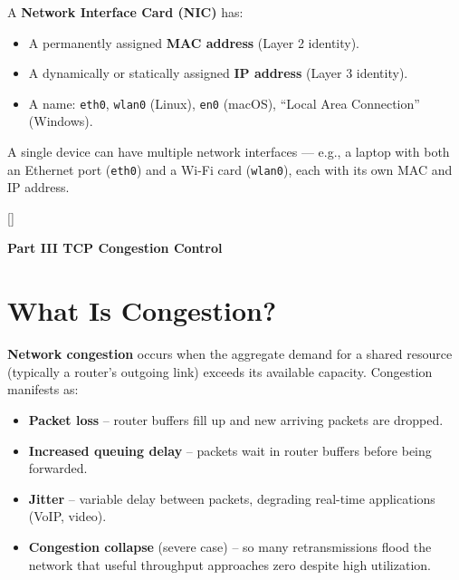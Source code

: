 \documentclass[11pt, letterpaper]{article}
\newcommand{\orangesections}{%
  \titleformat{\section}{\large\bfseries\color{sectionorange}}{}{0em}{}[\color{sectionorange}\titlerule]%
  \titleformat{\subsection}{\normalsize\bfseries\color{sectionorange!80!black}}{}{0em}{}%
}
\newcommand{\partbanner}[3]{%
  \begin{tcolorbox}[colback=#1, colframe=#2, boxrule=1.2pt, arc=4pt,
    left=8pt, right=8pt, top=6pt, bottom=6pt]
    \begin{center}{\LARGE\bfseries #3}\end{center}
  \end{tcolorbox}%
}
\begin{document}
A \textbf{Network Interface Card (NIC)} has:
\begin{itemize}[noitemsep]
  \item A permanently assigned \textbf{MAC address} (Layer 2 identity).
  \item A dynamically or statically assigned \textbf{IP address} (Layer 3 identity).
  \item A name: \texttt{eth0}, \texttt{wlan0} (Linux), \texttt{en0} (macOS), ``Local Area
        Connection'' (Windows).
\end{itemize}

A single device can have multiple network interfaces --- e.g., a laptop with both an Ethernet
port (\texttt{eth0}) and a Wi-Fi card (\texttt{wlan0}), each with its own MAC and IP address.


\newpage

\orangesections
{}
\partbanner{part4bg}{sectionorange}{Part III \quad TCP Congestion Control}

\vspace{8pt}

\section*{What Is Congestion?}

\textbf{Network congestion} occurs when the aggregate demand for a shared resource (typically a router's outgoing link) exceeds its available capacity. Congestion manifests as:

\begin{itemize}[noitemsep]
  \item \textbf{Packet loss} -- router buffers fill up and new arriving packets are dropped.
  \item \textbf{Increased queuing delay} -- packets wait in router buffers before being forwarded.
  \item \textbf{Jitter} -- variable delay between packets, degrading real-time applications (VoIP, video).
  \item \textbf{Congestion collapse} (severe case) -- so many retransmissions flood the network that useful throughput approaches zero despite high utilization.
\end{itemize}
\end{document}
